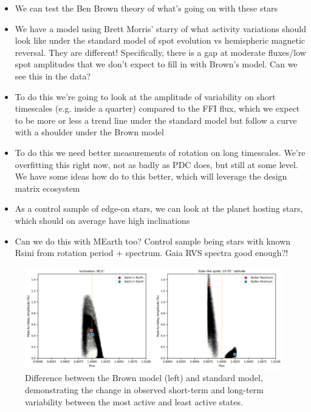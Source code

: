\documentclass[twocolumn,dvipsnames]{aastex631}
\begin{document}
\begin{itemize}

\item{We can test the Ben Brown theory of what's going on with these stars}
\item{We have a model using Brett Morris' starry of what activity variations should look like under the
standard model of spot evolution vs hemispheric magnetic reversal. They are different!
Specifically, there is a gap at moderate fluxes/low spot amplitudes that we don't expect to fill in with Brown's model. Can we see this in the data?}
\item{To do this we're going to look at the amplitude of variability on short timescales (e.g. inside a quarter) compared to the FFI flux, which we expect to be more or less a trend line under the standard model but follow a curve with a shoulder under the Brown model}
\item{To do this we need better measurements of rotation on long timescales. We're overfitting this right now, not as badly as PDC does, but still at some level. We have some ideas how do to this better, which will leverage the design matrix ecosystem}
\item{As a control sample of edge-on stars, we can look at the planet hosting stars, which should on average have high inclinations}
\item{Can we do this with MEarth too? Control sample being stars with known Rsini from rotation period + spectrum. Gaia RVS spectra good enough?!}

\end{itemize}

\begin{figure}
    \centering
    \includegraphics{figures/fleck_solar_like.png}
    \caption{Difference between the Brown model (left) and standard model, demonstrating the change in observed short-term and long-term variability between the most active and least active states.}
    \label{fig:fleck}
\end{figure}


{}

\end{document}
